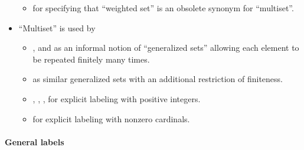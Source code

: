 \begin{remark}
\begin{itemize}
\begin{itemize}
      \item {} for specifying that \enquote{weighted set} is an obsolete synonym for \enquote{multiset}.
    \end{itemize}

    \item \enquote{Multiset} is used by
    \begin{itemize}
      \item {},  and  as an informal notion of \enquote{generalized sets} allowing each element to be repeated finitely many times.

      \item {} as similar generalized sets with an additional restriction of finiteness.

      \item {}, , ,   for explicit labeling with positive integers.

      \item {} for explicit labeling with nonzero cardinals.
    \end{itemize}
  \end{itemize}
\end{remark}

\paragraph{General labels}

